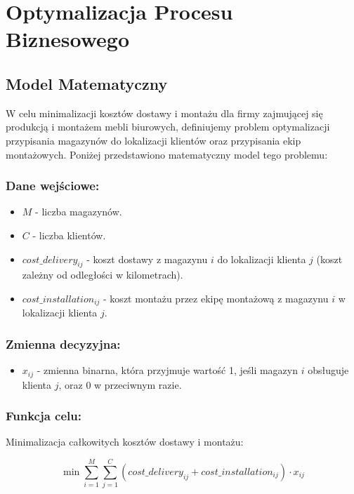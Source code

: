\section{Optymalizacja Procesu Biznesowego}
\subsection{Model Matematyczny}

W celu minimalizacji kosztów dostawy i montażu dla firmy zajmującej się produkcją i montażem mebli biurowych, definiujemy problem optymalizacji przypisania magazynów do lokalizacji klientów oraz przypisania ekip montażowych. Poniżej przedstawiono matematyczny model tego problemu:

\subsubsection*{Dane wejściowe:}

\begin{itemize}
    \item $M$ - liczba magazynów.
    \item $C$ - liczba klientów.
    \item $cost\_delivery_{ij}$ - koszt dostawy z magazynu $i$ do lokalizacji klienta $j$ (koszt zależny od odległości w kilometrach).
    \item $cost\_installation_{ij}$ - koszt montażu przez ekipę montażową z magazynu $i$ w lokalizacji klienta $j$.
\end{itemize}

\subsubsection*{Zmienna decyzyjna:}

\begin{itemize}
    \item $x_{ij}$ - zmienna binarna, która przyjmuje wartość 1, jeśli magazyn $i$ obsługuje klienta $j$, oraz 0 w przeciwnym razie.
\end{itemize}

\subsubsection*{Funkcja celu:}

Minimalizacja całkowitych kosztów dostawy i montażu:

\[
    \min \sum_{i=1}^{M} \sum_{j=1}^{C} (cost\_delivery_{ij} + cost\_installation_{ij}) \cdot x_{ij}
\]

